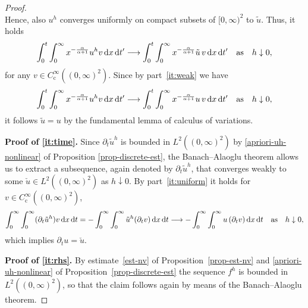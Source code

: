 \documentclass[reqno,12pt]{amsart}
\renewcommand{\d}{\ensuremath{\mathrm{d}}}
\renewcommand{\d}{\ensuremath{{\rm d}}}
\numberwithin{equation}{section}
\begin{document}
\begin{proof}
\[\]
%
Hence, also $u^h$ converges uniformly on compact subsets of $[0,\infty)^2$ to $\tilde u$. Thus, it holds
%
\[
\int_0^t \int_0^\infty x^{-\frac{\alpha}{\alpha+1}} u^h v \, \d x \, \d t' \longrightarrow \int_0^t \int_0^\infty x^{-\frac{\alpha}{\alpha+1}} \tilde u \, v \, \d x \, \d t' \quad \text{as} \quad h \downarrow 0,
\]
%
for any $v \in C^\infty_\mathrm{c}((0,\infty)^2)$.  Since by part~\eqref{it:weak} we have
%
\[
\int_0^t \int_0^\infty x^{-\frac{\alpha}{\alpha+1}} u^h v \, \d x \, \d t' \longrightarrow \int_0^t \int_0^\infty x^{-\frac{\alpha}{\alpha+1}} u \, v \, \d x \, \d t' \quad \text{as} \quad h \downarrow 0,
\]
%
it follows $\tilde u = u$ by the fundamental lemma of calculus of variations.

%
\bigskip
%

%
\textbf{Proof of \eqref{it:time}. }
%
Since $\partial_t \tilde u^h$ is bounded in $L^2((0,\infty)^2)$ by \eqref{apriori-uh-nonlinear} of Proposition \ref{prop-discrete-est}, the Banach--Alaoglu theorem allows us to extract a subsequence, again denoted by $\partial_t \tilde u^h$, that converges weakly to some $\check u \in L^2((0,\infty)^2)$ as $h \downarrow 0$. By part~\eqref{it:uniform} it holds for $v \in C^\infty_\mathrm{c}((0,\infty)^2)$,
%
\[
\int_0^\infty \int_0^\infty (\partial_t \tilde u^h) v \, \d x \, \d t = - \int_0^\infty \int_0^\infty \tilde u^h (\partial_t v) \, \d x \, \d t \longrightarrow - \int_0^\infty \int_0^\infty u \, (\partial_t v) \, \d x \, \d t  \quad \text{as} \quad h \downarrow 0,
\]
%
which implies $\partial_t u = \check u$.

%
\bigskip
%

%
\textbf{Proof of \eqref{it:rhs}. }
%
By estimate~\eqref{est-nv} of Proposition~\ref{prop-est-nv} and \eqref{apriori-uh-nonlinear} of Proposition~\ref{prop-discrete-est} the sequence $f^h$ is bounded in $L^2((0,\infty)^2)$, so that the claim follows again by means of the Banach--Alaoglu theorem.

%
\bigskip
%


\end{proof}
\end{document}
